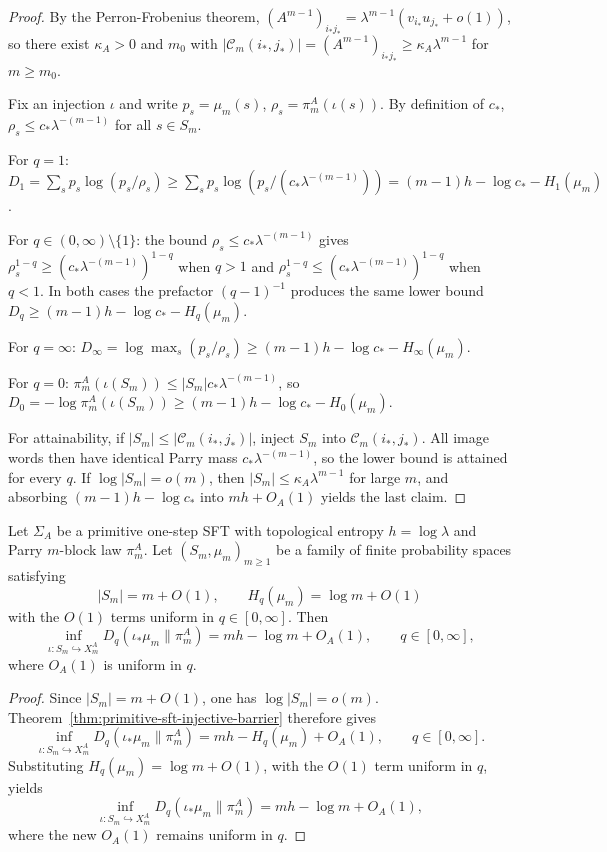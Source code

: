 \begin{proof}
By the Perron-Frobenius theorem,
\((A^{m-1})_{i_*j_*}=\lambda^{m-1}(v_{i_*}u_{j_*}+o(1))\), so there exist
\(\kappa_A>0\) and \(m_0\) with
\(|\mathcal C_m(i_*,j_*)|=(A^{m-1})_{i_*j_*}\ge \kappa_A\lambda^{m-1}\) for
\(m\ge m_0\).

Fix an injection \(\iota\) and write \(p_s=\mu_m(s)\),
\(\rho_s=\pi_m^A(\iota(s))\). By definition of \(c_*\),
\(\rho_s\le c_*\lambda^{-(m-1)}\) for all \(s\in S_m\).

For \(q=1\):
\(D_1=\sum_s p_s\log(p_s/\rho_s)
\ge \sum_s p_s\log(p_s/(c_*\lambda^{-(m-1)}))
=(m-1)h-\log c_*-H_1(\mu_m)\).

For \(q\in(0,\infty)\setminus\{1\}\): the bound
\(\rho_s\le c_*\lambda^{-(m-1)}\) gives
\(\rho_s^{1-q}\ge (c_*\lambda^{-(m-1)})^{1-q}\) when \(q>1\) and
\(\rho_s^{1-q}\le (c_*\lambda^{-(m-1)})^{1-q}\) when \(q<1\). In both cases
the prefactor \((q-1)^{-1}\) produces the same lower bound
\(D_q\ge (m-1)h-\log c_*-H_q(\mu_m)\).

For \(q=\infty\):
\(D_\infty=\log\max_s(p_s/\rho_s)\ge (m-1)h-\log c_*-H_\infty(\mu_m)\).

For \(q=0\):
\(\pi_m^A(\iota(S_m))\le |S_m|c_*\lambda^{-(m-1)}\), so
\(D_0=-\log\pi_m^A(\iota(S_m))\ge (m-1)h-\log c_*-H_0(\mu_m)\).

For attainability, if \(|S_m|\le |\mathcal C_m(i_*,j_*)|\), inject
\(S_m\) into \(\mathcal C_m(i_*,j_*)\). All image words then have identical
Parry mass \(c_*\lambda^{-(m-1)}\), so the lower bound is attained for
every \(q\). If \(\log|S_m|=o(m)\), then
\(|S_m|\le \kappa_A\lambda^{m-1}\) for large \(m\), and absorbing
\((m-1)h-\log c_*\) into \(mh+O_A(1)\) yields the last claim.
\end{proof}

\begin{corollary}
\label{cor:low-complexity-source-barrier}
Let \(\Sigma_A\) be a primitive one-step SFT with topological entropy
\(h=\log\lambda\) and Parry \(m\)-block law \(\pi_m^A\). Let
\((S_m,\mu_m)_{m\ge 1}\) be a family of finite probability spaces satisfying
\[
|S_m|=m+O(1),
\qquad
H_q(\mu_m)=\log m+O(1)
\]
with the \(O(1)\) terms uniform in \(q\in[0,\infty]\). Then
\[
\inf_{\iota:S_m\hookrightarrow X_m^A}
D_q(\iota_{*}\mu_m\|\pi_m^A)
=
mh-\log m+O_A(1),
\qquad q\in[0,\infty],
\]
where \(O_A(1)\) is uniform in \(q\).
\end{corollary}

\begin{proof}
Since \(|S_m|=m+O(1)\), one has \(\log|S_m|=o(m)\).
Theorem~\ref{thm:primitive-sft-injective-barrier} therefore gives
\[
\inf_{\iota:S_m\hookrightarrow X_m^A}
D_q(\iota_{*}\mu_m\|\pi_m^A)
=
mh-H_q(\mu_m)+O_A(1),
\qquad q\in[0,\infty].
\]
Substituting \(H_q(\mu_m)=\log m+O(1)\), with the \(O(1)\) term uniform in
\(q\), yields
\[
\inf_{\iota:S_m\hookrightarrow X_m^A}
D_q(\iota_{*}\mu_m\|\pi_m^A)
=
mh-\log m+O_A(1),
\]
where the new \(O_A(1)\) remains uniform in \(q\).
\end{proof}
